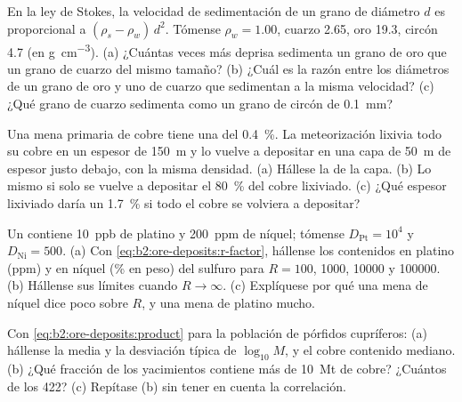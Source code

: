 \begin{exercise}[$\star$]\label{exo:b2:ore-deposits:3}
En la ley de Stokes, la velocidad de sedimentación de un grano de diámetro $d$ es proporcional a $(\rho_s -
\rho_w)\,d^2$. Tómense $\rho_w = 1.00$, cuarzo 2.65, oro 19.3, circón 4.7 (en
\unit{g.cm^{-3}}). (a) ¿Cuántas veces más deprisa sedimenta un grano de oro que un grano de cuarzo del
mismo tamaño? (b) ¿Cuál es la razón entre los diámetros de un grano de oro y uno de cuarzo que sedimentan a la
misma velocidad? (c) ¿Qué grano de cuarzo sedimenta como un grano de circón de \qty{0.1}{mm}?
\end{exercise}

\begin{exercise}[$\star$]\label{exo:b2:ore-deposits:4}
Una mena primaria de cobre tiene una  del \qty{0.4}{\percent}. La meteorización lixivia todo su cobre en un
espesor de \qty{150}{m} y lo vuelve a depositar en una capa de \qty{50}{m} de espesor justo debajo, con la misma
densidad. (a) Hállese la  de la capa. (b) Lo mismo si solo se vuelve a depositar el \qty{80}{\percent} del
cobre lixiviado. (c) ¿Qué espesor lixiviado daría un \qty{1.7}{\percent} si todo
el cobre se volviera a depositar?
\end{exercise}

\begin{exercise}[$\star\star$]\label{exo:b2:ore-deposits:5}
Un  contiene \qty{10}{ppb} de platino y \qty{200}{ppm} de níquel; tómense $D_{\mathrm{Pt}} =
10^4$ y $D_{\mathrm{Ni}} = 500$. (a) Con \eqref{eq:b2:ore-deposits:r-factor}, hállense los contenidos en
platino (ppm) y en níquel (\% en peso) del sulfuro para $R = 100$, \num{1000}, \num{10000}
y \num{100000}. (b) Hállense sus límites cuando $R \to \infty$. (c) Explíquese por qué una mena de níquel dice
poco sobre $R$, y una mena de platino mucho.
\end{exercise}

\begin{exercise}[$\star\star$]\label{exo:b2:ore-deposits:6}
Con \eqref{eq:b2:ore-deposits:product} para la población de pórfidos cupríferos: (a) hállense la media y la
desviación típica de $\log_{10} M$, y el cobre contenido mediano. (b) ¿Qué fracción de los yacimientos
contiene más de \qty{10}{Mt} de cobre? ¿Cuántos de los 422? (c) Repítase (b) sin tener en cuenta la correlación.
\end{exercise}

